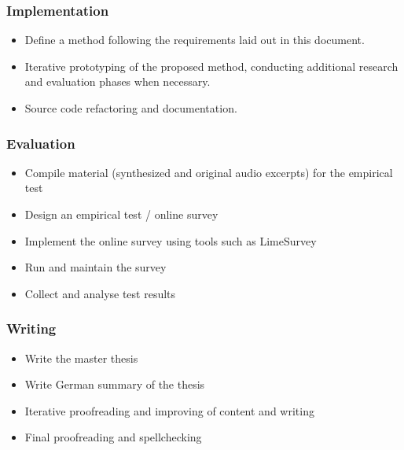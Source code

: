 \documentclass{article}
\begin{document}
\subsubsection*{Implementation}
\begin{itemize}
    \item Define a method following the requirements laid out in this document.
    \item Iterative prototyping of the proposed method, conducting additional research and evaluation phases when necessary. 
    \item Source code refactoring and documentation.
\end{itemize}


\subsubsection*{Evaluation}
\begin{itemize}
    \item Compile material (synthesized and original audio excerpts) for the empirical test
    \item Design an empirical test / online survey
    \item Implement the online survey using tools such as LimeSurvey
    \item Run and maintain the survey
    \item Collect and analyse test results 
\end{itemize}

\subsubsection*{Writing}
\begin{itemize}
    \item Write the master thesis 
    \item Write German summary of the thesis
    \item Iterative proofreading and improving of content and writing
    \item Final proofreading and spellchecking
\end{itemize}

\newpage
%
\printbibliography
\end{document}
